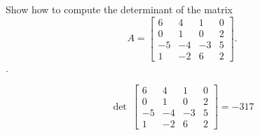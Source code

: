 
\begin{exerciseStatement}


Show how to compute the determinant of the matrix \[A= \left[\begin{array}{cccc}
6 & 4 & 1 & 0 \\
0 & 1 & 0 & 2 \\
-5 & -4 & -3 & 5 \\
1 & -2 & 6 & 2
\end{array}\right] .\].


\end{exerciseStatement}
    
\begin{exerciseAnswer} 
\[\operatorname{det}\  \left[\begin{array}{cccc}
6 & 4 & 1 & 0 \\
0 & 1 & 0 & 2 \\
-5 & -4 & -3 & 5 \\
1 & -2 & 6 & 2
\end{array}\right] = -317 \]
\end{exerciseAnswer}
    

